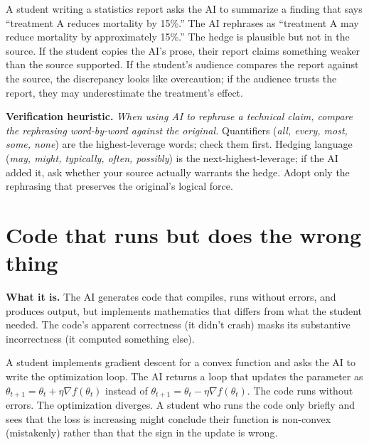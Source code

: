 \documentclass[11pt]{book}
\begin{document}
\begin{example}
A student writing a statistics report asks the AI to summarize a finding that says ``treatment A reduces mortality by 15\%.'' The AI rephrases as ``treatment A may reduce mortality by approximately 15\%.'' The hedge is plausible but not in the source. If the student copies the AI's prose, their report claims something weaker than the source supported. If the student's audience compares the report against the source, the discrepancy looks like overcaution; if the audience trusts the report, they may underestimate the treatment's effect.
\end{example}

\textbf{Verification heuristic.} \emph{When using AI to rephrase a technical claim, compare the rephrasing word-by-word against the original.} Quantifiers (\emph{all, every, most, some, none}) are the highest-leverage words; check them first. Hedging language (\emph{may, might, typically, often, possibly}) is the next-highest-leverage; if the AI added it, ask whether your source actually warrants the hedge. Adopt only the rephrasing that preserves the original's logical force.

\section{Code that runs but does the wrong thing}
\label{sec:wrong-code}

\textbf{What it is.} The AI generates code that compiles, runs without errors, and produces output, but implements mathematics that differs from what the student needed. The code's apparent correctness (it didn't crash) masks its substantive incorrectness (it computed something else).

\begin{example}
A student implements gradient descent for a convex function and asks the AI to write the optimization loop. The AI returns a loop that updates the parameter as $\theta_{t+1} = \theta_t + \eta \nabla f(\theta_t)$ instead of $\theta_{t+1} = \theta_t - \eta \nabla f(\theta_t)$. The code runs without errors. The optimization diverges. A student who runs the code only briefly and sees that the loss is increasing might conclude their function is non-convex (mistakenly) rather than that the sign in the update is wrong.
\end{example}
\end{document}
